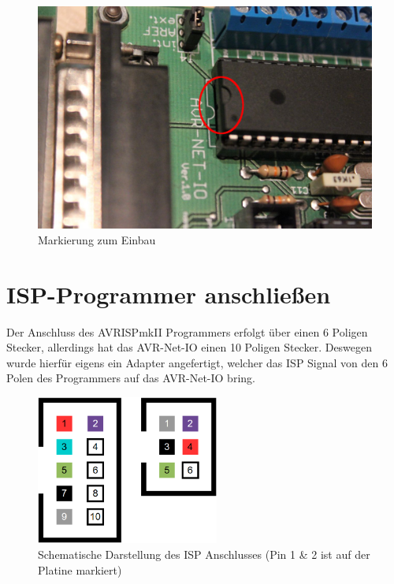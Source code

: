 \begin{figure}[H]
\centering
\includegraphics[width=13cm]{content/pictures/Anleitung/tauscheProzessor/4_Markierung.jpg}
\caption{Markierung zum Einbau}
\label{ausbau4}
\end{figure}

\section{ISP-Programmer anschließen}

Der Anschluss des AVRISPmkII Programmers erfolgt über einen 6 Poligen Stecker,
allerdings hat das AVR-Net-IO einen 10 Poligen Stecker. Deswegen wurde hierfür
eigens ein Adapter angefertigt, welcher das ISP Signal von den 6 Polen des
Programmers auf das AVR-Net-IO bring.

\begin{figure}[htp]
\begin{center}
  \includegraphics[width=6cm]{content/pictures/Anleitung/ISP-Stecker.png}
  \caption[Schematische Darstellung des ISP Anschlusses]{Schematische Darstellung des ISP Anschlusses (Pin 1 \& 2
  ist auf der Platine markiert)}
  \label{ispanschluss}
\end{center}
\end{figure}

